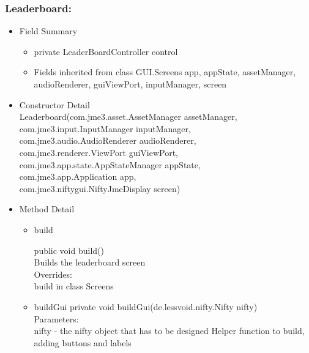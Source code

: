 \documentclass[letterpaper]{article}
\begin{document}
							\subsubsection*{Leaderboard:}
						\vspace{0.1in}	
							\begin{itemize}
								\item	Field Summary
										\begin{itemize}
		\item private LeaderBoardController 	control 
		\item Fields inherited from class GUI.Screens
app, appState, assetManager, audioRenderer, guiViewPort, inputManager, screen
		\end{itemize}
								\item	Constructor Detail \\
								Leaderboard(com.jme3.asset.AssetManager assetManager,\\								 com.jme3.input.InputManager inputManager, \\ com.jme3.audio.AudioRenderer audioRenderer, \\ com.jme3.renderer.ViewPort guiViewPort, \\ com.jme3.app.state.AppStateManager appState, \\ com.jme3.app.Application app, \\ com.jme3.niftygui.NiftyJmeDisplay screen) \\
								\item	Method Detail
										\begin{itemize}
						\item	
    build

    public void build() \\

    Builds the leaderboard screen \\ 

    Overrides: \\
        build in class Screens \\
											\item buildGui
												private void buildGui(de.lessvoid.nifty.Nifty nifty) \\

Parameters: \\
    nifty - the nifty object that has to be designed Helper function to build, adding buttons and labels \\
										\end{itemize}
							\end{itemize}
\end{document}
